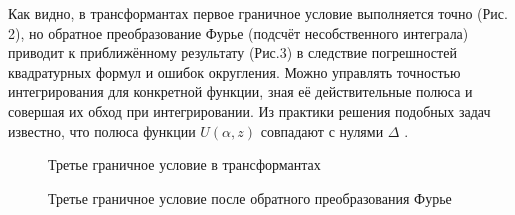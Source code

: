\documentclass[a4paper, 12pt]{article}
\begin{document}
Как видно, в трансформантах первое граничное условие выполняется точно (Рис. 2), но обратное преобразование Фурье (подсчёт несобственного интеграла) приводит к приближённому результату (Рис.3) в следствие погрешностей квадратурных формул и ошибок округления. Можно управлять точностью интегрирования для конкретной функции, зная её действительные полюса и совершая их обход при интегрировании. Из практики решения подобных задач известно, что полюса функции $U(\alpha,z)$ совпадают с нулями $\Delta$ \cite{g89,new}.

\begin{figure}[h!]
\noindent{}
\caption{Третье граничное условие в трансформантах}
\label{figCurves}
\end{figure}

\begin{figure}[h!]
\noindent{}
\caption{Третье граничное условие после обратного преобразования Фурье}
\label{figCurves}
\end{figure}
\end{document}
